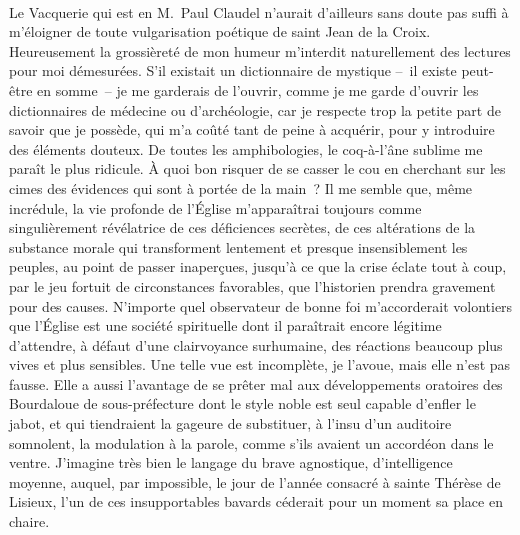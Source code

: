 \documentclass[french,twoside]{book} %
\newcommand{\astertri}{\medskip\par\centerline{\color{rubric}\large\selectfont{\syms ✻\,✻\,✻}}\medskip\par}%
\begin{document}
\noindent  \par
Le Vacquerie qui est en M. Paul Claudel n’aurait d’ailleurs sans doute pas suffi à m’éloigner de toute vulgarisation poétique de saint Jean de la Croix. Heureusement la grossièreté de mon humeur m’interdit naturellement des lectures pour moi démesurées. S’il existait un dictionnaire de mystique – il existe peut-être en somme – je me garderais de l’ouvrir, comme je me garde d’ouvrir les dictionnaires de médecine ou d’archéologie, car je respecte trop la petite part de savoir que je possède, qui m’a coûté tant de peine à acquérir, pour y introduire des éléments douteux. De toutes les amphibologies, le coq-à-l’âne sublime me paraît le plus ridicule. À quoi bon risquer de se casser le cou en cherchant sur les cimes des évidences qui sont à portée de la main ? Il me semble que, même incrédule, la vie profonde de l’Église m’apparaîtrai toujours comme singulièrement révélatrice de ces déficiences secrètes, de ces altérations de la substance morale qui transforment lentement et presque insensiblement les peuples, au point de passer inaperçues, jusqu’à ce que la crise éclate tout à coup, par le jeu fortuit de circonstances favorables, que l’historien prendra gravement pour des causes. N’importe quel observateur de bonne foi m’accorderait volontiers que l’Église est une société spirituelle dont il paraîtrait encore légitime d’attendre, à défaut d’une clairvoyance surhumaine, des réactions beaucoup plus vives et plus sensibles. Une telle vue est incomplète, je l’avoue, mais elle n’est pas fausse. Elle a aussi l’avantage de se prêter mal aux développements oratoires des Bourdaloue de sous-préfecture dont le style noble est seul capable d’enfler le jabot, et qui tiendraient la gageure de substituer, à l’insu d’un auditoire somnolent, la modulation à la parole, comme s’ils avaient un accordéon dans le ventre. J’imagine très bien le langage du brave agnostique, d’intelligence moyenne, auquel, par impossible, le jour de l’année consacré à sainte Thérèse de Lisieux, l’un de ces insupportables bavards céderait pour un moment sa place en chaire.\par
 \par

\astertri
\end{document}

